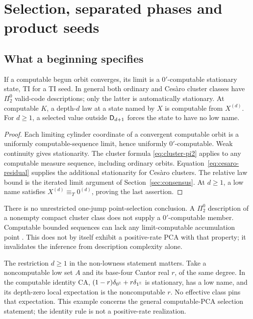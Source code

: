 \section{Selection, separated phases and product seeds}\label{sec:selection}
\subsection{What a beginning specifies}
\begin{proposition}\label{prop:selection}
If a computable begun orbit converges, its limit is a
$0'$-computable stationary state, TI for a TI seed. In general
both ordinary and Ces\`aro cluster classes have $\Pi^0_2$
valid-code descriptions; only the latter is automatically
stationary. At computable $K$, a depth-$d$ law at a state named by $X$ is computable
from $X^{(d)}$. For $d\geq1$, a selected value outside
$\mathsf D_{d+1}$ forces the state to have no low name.
\end{proposition}
\begin{proof}
Each limiting cylinder coordinate of a convergent computable
orbit is a uniformly computable-sequence limit, hence uniformly
$0'$-computable. Weak continuity gives stationarity. The cluster
formula \eqref{eq:cluster-pi2} applies to any computable measure
sequence, including ordinary orbits. Equation~\eqref{eq:cesaro-residual}
supplies the additional stationarity for Ces\`aro clusters.
The relative law bound is the iterated limit argument of
Section~\ref{sec:consensus}. At $d\geq1$, a low name satisfies
$X^{(d)}\equiv_T0^{(d)}$, proving the last assertion.
\end{proof}

There is no unrestricted one-jump point-selection conclusion.
A $\Pi^0_2$ description of a nonempty compact cluster class
does not supply a $0'$-computable member. Computable bounded
sequences can lack any limit-computable accumulation point
\cite[Corollary~11.8]{bgm}. This does not by itself exhibit a
positive-rate PCA with that property; it invalidates the inference
from description complexity alone.

The restriction $d\geq1$ in the non-lowness statement matters.
Take a noncomputable low set $A$ and its base-four Cantor real
$r$, of the same degree. In the computable identity CA,
$(1-r)\delta_{0^\mathbb Z}+r\delta_{1^\mathbb Z}$ is stationary, has a low name,
and its depth-zero local expectation is the noncomputable $r$.
No effective class pins that expectation. This example concerns
the general computable-PCA selection statement; the identity
rule is not a positive-rate realization.

